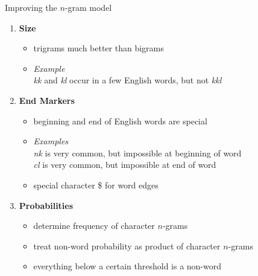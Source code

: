 \documentclass[professionalfonts, xcolor={usenames,svgnames,x11names,table}]{beamer}
\begin{document}
\begin{frame}{Improving the $n$-gram model}
    \begin{enumerate}
        \item \textbf{Size}
            \begin{itemize}
                \item trigrams much better than bigrams
                \item \emph{Example}\\
                    \emph{kk} and \emph{kl} occur in a few English words, but not \emph{kkl}
            \end{itemize}
        \item \textbf{End Markers}
            \begin{itemize}
                \item beginning and end of English words are special
                \item \emph{Examples}\\
                    \emph{nk} is very common, but impossible at beginning of word\\
                    \emph{cl} is very common, but impossible at end of word
                \item special character \$ for word edges\\
            \end{itemize}
        \item \textbf{Probabilities}
            \begin{itemize}
                \item determine frequency of character $n$-grams
                \item treat non-word probability as product of character $n$-grams
                \item everything below a certain threshold is a non-word
            \end{itemize}
    \end{enumerate}
\end{frame}
\end{document}
